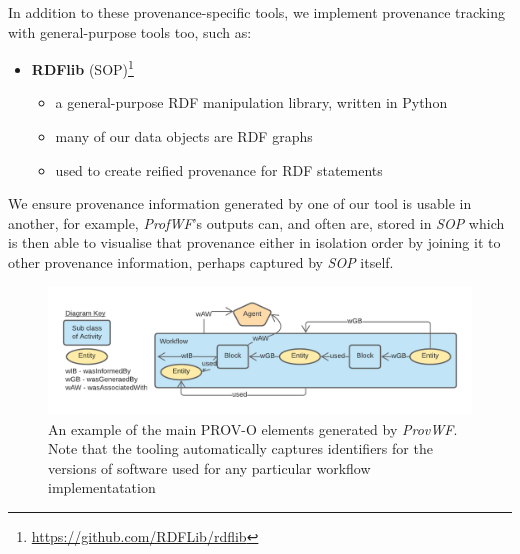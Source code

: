 \documentclass[letterpaper,twocolumn,10pt]{article}
\begin{document}
In addition to these provenance-specific tools, we implement provenance tracking with general-purpose tools too, such as:

\begin{itemize}
  \item \textbf{RDFlib} (SOP)\footnote{\url{https://github.com/RDFLib/rdflib}}
  \begin{itemize}
    \item a general-purpose RDF manipulation library, written in Python
    \item many of our data objects are RDF graphs
    \item used to create reified provenance for RDF statements     
  \end{itemize}
\end{itemize}  

We ensure provenance information generated by one of our tool is usable in another, for example, \textit{ProfWF}'s outputs
can, and often are, stored in \textit{SOP} which is then able to visualise that provenance either in isolation order
by joining it to other provenance information, perhaps captured by \textit{SOP} itself.


\begin{figure}
  \begin{center}
    \includegraphics[width=\textwidth]{images/provwf.png}
  \end{center}
  \caption{\label{fig:overview} An example of the main PROV-O elements generated by \textit{ProvWF}. Note that the tooling automatically captures identifiers for the versions of software used for any particular workflow implementatation}
  \end{figure}
\end{document}
